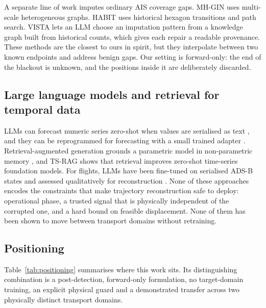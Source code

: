 A separate line of work imputes ordinary AIS coverage gaps. MH-GIN
\citep{liu2026mhgin} uses multi-scale heterogeneous graphs. HABIT
\citep{spiliopoulos2026habit} uses historical hexagon transitions and path
search. VISTA \citep{liu2026vista} lets an LLM choose an imputation pattern
from a knowledge graph built from historical counts, which gives each repair
a readable provenance. These methods are the closest to ours in spirit, but
they interpolate between two known endpoints and address benign gaps. Our
setting is forward-only: the end of the blackout is unknown, and the
positions inside it are deliberately discarded.

\subsection{Large language models and retrieval for temporal data}

LLMs can forecast numeric series zero-shot when values are serialised as
text \citep{gruver2023large}, and they can be reprogrammed for forecasting
with a small trained adapter \citep{jin2024timellm}. Retrieval-augmented
generation grounds a parametric model in non-parametric memory
\citep{lewis2020retrieval}, and TS-RAG \citep{ning2025tsrag} shows that
retrieval improves zero-shot time-series foundation models. For flights,
LLMs have been fine-tuned on serialised ADS-B states \citep{luo2025large}
and assessed qualitatively for reconstruction \citep{zhang2024exploratory}.
None of these approaches encodes the constraints that make trajectory
reconstruction safe to deploy: operational phase, a trusted signal that is
physically independent of the corrupted one, and a hard bound on feasible
displacement. None of them has been shown to move between transport domains
without retraining.

\subsection{Positioning}

Table~\ref{tab:positioning} summarises where this work sits. Its
distinguishing combination is a post-detection, forward-only formulation, no
target-domain training, an explicit physical guard and a demonstrated
transfer across two physically distinct transport domains.

